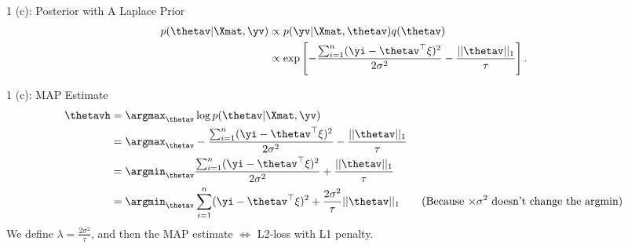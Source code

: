 \documentclass[aspectratio=169]{beamer}
\begin{document}
\begin{frame}{1 (c): Posterior with A Laplace Prior}
	\begin{equation*}
		\begin{aligned}
			p(\thetav | \Xmat, \yv) &\propto p(\yv | \Xmat, \thetav) q(\thetav) \\
			&\propto \exp \left[-\frac{\sum_{i=1}^n(\yi - \thetav^\top \xi)^2}{2\sigma^2}- \frac{||\thetav||_1}{\tau} \right]. \\
		\end{aligned}
	\end{equation*}
\end{frame}

\begin{frame}{1 (c): MAP Estimate}
	\begin{equation*}
		\begin{aligned}
			\thetavh &= \argmax_{\thetav} \log p(\thetav | \Xmat, \yv) \\
			&= \argmax_{\thetav} -\frac{\sum_{i=1}^n(\yi - \thetav^\top \xi)^2}{2\sigma^2} - \frac{||\thetav||_1}{\tau} \\
			&= \argmin_{\thetav} \frac{\sum_{i=1}^n(\yi - \thetav^\top \xi)^2}{2\sigma^2} + \frac{||\thetav||_1}{\tau} \\
			&= \argmin_{\thetav} \sum_{i=1}^n(\yi - \thetav^\top \xi)^2 + \frac{2 \sigma^2}{\tau} ||\thetav||_1 \qquad \text{(Because $\times \sigma^2$ doesn't change the argmin)}
		\end{aligned}
	\end{equation*}
	We define $\lambda = \frac{2 \sigma^2}{\tau}$, and then the MAP estimate $\Leftrightarrow$ L2-loss with L1 penalty.
\end{frame}
\end{document}
